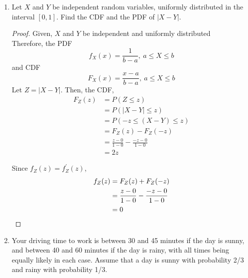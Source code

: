 \documentclass[paper=usletter, fontsize=12pt]{article}
\begin{document}
\begin{enumerate}
\begin{enumerate}
\begin{proof}
            \end{proof}

        \end{enumerate}

        \item Let $X$ and $Y$ be independent random variables, uniformly
        distributed in the interval $[0,1]$. Find the CDF and the PDF of
        $|X-Y|$.
        \begin{proof}

            Given, $X$ and $Y$ be independent and uniformly distributed\\
            Therefore, the PDF
            \begin{equation*}
                f_X(x) = \frac{1}{b-a}, \ a \le X \le b
            \end{equation*}
            and CDF
            \begin{equation*}
                F_X(x) = \frac{x-a}{b-a}, \ a \le X \le b
            \end{equation*}
            Let $Z=|X-Y|$. Then, the CDF,
            \begin{align*}
                F_Z(z) & = P(Z \le z)\\
                & = P(|X-Y| \le z) \\
                & = P(-z \le (X-Y) \le z) \\
                & = F_Z(z) - F_Z(-z) \\
                & = \frac{z-0}{1-0} - \frac{-z-0}{1-0}\\
                & = 2z
            \end{align*}
            \endgroup

            Since $f_Z(z)=f^\prime_Z(z)$,
            \begin{align*}
                f_Z(z) & = F_Z(z) + F_Z(-z) \\
                & = \frac{z-0}{1-0} - \frac{-z-0}{1-0}\\
                & = 0 \qedhere
            \end{align*}
            \endgroup

        \end{proof}

        \item Your driving time to work is between 30 and 45 minutes if the day
        is sunny, and between 40 and 60 minutes if the day is rainy, with all
        times being equally likely in each case. Assume that a day is sunny
        with probability 2/3 and rainy with probability 1/3.
        \begin{enumerate}


\end{enumerate}
\end{enumerate}
\end{document}
